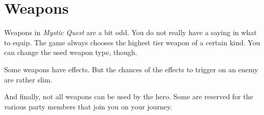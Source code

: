 \chapter{Weapons}

Weapons in \textit{Mystic Quest} are a bit odd. You do not really have a saying in what to equip. The game always chooses the highest tier weapon of a certain kind. You can change the used weapon type, though.

Some weapons have effects. But the chances of the effects to trigger on an enemy are rather slim.

And finally, not all weapons can be used by the hero. Some are reserved for the various party members that join you on your journey.

\newpage

\newpage

\newpage

\newpage

\newpage

\newpage

\newpage

\newpage

\newpage

\newpage

\newpage

\newpage

\newpage

\newpage

\newpage

